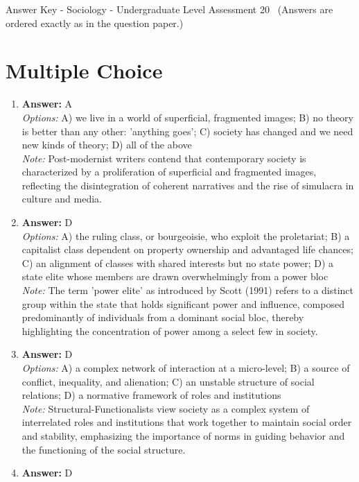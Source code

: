 \documentclass[12pt]{article}
\begin{document}
\begin{center}
Answer Key - Sociology - Undergraduate Level Assessment 20 \
\small (Answers are ordered exactly as in the question paper.)
\end{center}

\section*{Multiple Choice}
\begin{enumerate}[label=\arabic*.]
\item \textbf{Answer:} A
\\ \textit{Options:} A) we live in a world of superficial, fragmented images; B) no theory is better than any other: 'anything goes'; C) society has changed and we need new kinds of theory; D) all of the above
\\ \textit{Note:} Post-modernist writers contend that contemporary society is characterized by a proliferation of superficial and fragmented images, reflecting the disintegration of coherent narratives and the rise of simulacra in culture and media.
\item \textbf{Answer:} D
\\ \textit{Options:} A) the ruling class, or bourgeoisie, who exploit the proletariat; B) a capitalist class dependent on property ownership and advantaged life chances; C) an alignment of classes with shared interests but no state power; D) a state elite whose members are drawn overwhelmingly from a power bloc
\\ \textit{Note:} The term 'power elite' as introduced by Scott (1991) refers to a distinct group within the state that holds significant power and influence, composed predominantly of individuals from a dominant social bloc, thereby highlighting the concentration of power among a select few in society.
\item \textbf{Answer:} D
\\ \textit{Options:} A) a complex network of interaction at a micro-level; B) a source of conflict, inequality, and alienation; C) an unstable structure of social relations; D) a normative framework of roles and institutions
\\ \textit{Note:} Structural-Functionalists view society as a complex system of interrelated roles and institutions that work together to maintain social order and stability, emphasizing the importance of norms in guiding behavior and the functioning of the social structure.
\item \textbf{Answer:} D

\end{enumerate}
\end{document}
